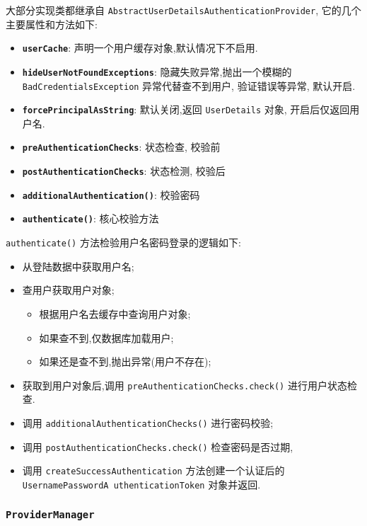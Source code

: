 大部分实现类都继承自 \texttt{AbstractUserDetailsAuthenticationProvider}, 它的几个主要属性和方法如下:

\begin{itemize}
  \item \textbf{\texttt{userCache}}: 声明一个用户缓存对象,默认情况下不启用.
  \item \textbf{\texttt{hideUserNotFoundExceptions}}: 隐藏失败异常,抛出一个模糊的 \texttt{BadCredentialsException} 异常代替查不到用户, 验证错误等异常, 默认开启.
  \item \textbf{\texttt{forcePrincipalAsString}}: 默认关闭,返回 \texttt{UserDetails} 对象, 开启后仅返回用户名.
  \item \textbf{\texttt{preAuthenticationChecks}}: 状态检查, 校验前
  \item \textbf{\texttt{postAuthenticationChecks}}: 状态检测, 校验后
  \item \textbf{\texttt{additionalAuthentication()}}: 校验密码
  \item \textbf{\texttt{authenticate()}}: 核心校验方法
\end{itemize}

\texttt{authenticate()} 方法检验用户名密码登录的逻辑如下:
\begin{itemize}
  \item 从登陆数据中获取用户名;
  \item 查用户获取用户对象;
  \begin{itemize}
    \item 根据用户名去缓存中查询用户对象;
    \item 如果查不到,仅数据库加载用户;
    \item 如果还是查不到,抛出异常(用户不存在);
  \end{itemize}
  \item 获取到用户对象后,调用 \texttt{preAuthenticationChecks.check()} 进行用户状态检查.
  \item 调用 \texttt{additionalAuthenticationChecks()} 进行密码校验;
  \item 调用 \texttt{postAuthenticationChecks.check()} 检查密码是否过期,
  \item 调用 \texttt{createSuccessAuthentication} 方法创建一个认证后的 \texttt{UsernamePasswordA uthenticationToken} 对象并返回.
\end{itemize}

\subsubsection{\texttt{ProviderManager}}

